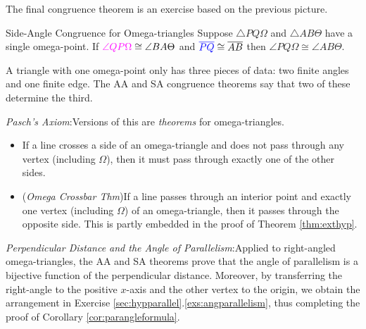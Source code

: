 The final congruence theorem is an exercise based on the previous picture.

\begin{cor}{Side-Angle Congruence for Omega-triangles}{}
	Suppose $\triangle PQ\Omega$ and $\triangle AB\Theta$ have a single omega-point. If $\textcolor{Magenta}{\angle QP\Omega} \cong\angle BA\Theta$ and $\textcolor{blue}{\overline{PQ}}\cong\overline{AB}$ then $\angle PQ\Omega \cong\angle AB\Theta$.
\end{cor}

A triangle with one omega-point only has three pieces of data: two finite angles and one finite edge. The AA and SA congruence theorems say that two of these determine the third.


\emph{Pasch's Axiom}:\quad Versions of this are \emph{theorems} for omega-triangles.
\begin{itemize}
  \item If a line crosses a side of an omega-triangle and does not pass through any vertex (including $\Omega$), then it must pass through exactly one of the other sides.
  \item (\emph{Omega Crossbar Thm})\lstsp If a line passes through an interior point and exactly one vertex (including $\Omega$) of an omega-triangle, then it passes through the opposite side. This is partly embedded in the proof of Theorem \ref{thm:exthyp}.
\end{itemize}


\emph{Perpendicular Distance and the Angle of Parallelism}:\quad Applied to right-angled omega-triangles, the AA and SA theorems prove that the angle of parallelism is a bijective function of the perpendicular distance. Moreover, by transferring the right-angle to the positive $x$-axis and the other vertex to the origin, we obtain the arrangement in Exercise \ref*{sec:hypparallel}.\ref{exs:angparallelism}, thus completing the proof of Corollary \ref{cor:parangleformula}.


